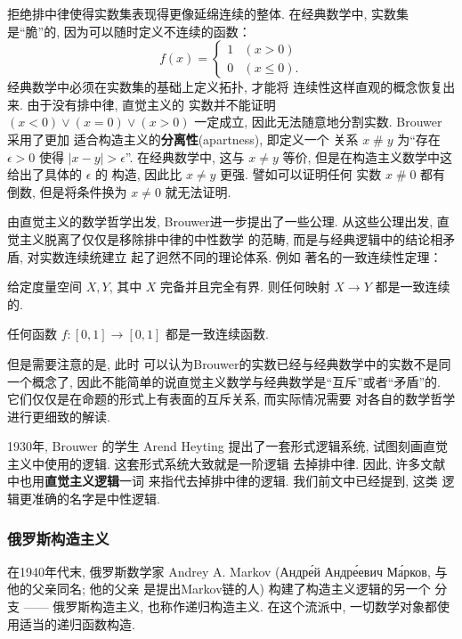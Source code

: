 拒绝排中律使得实数集表现得更像延绵连续的整体. 在经典数学中,
实数集是“脆”的, 因为可以随时定义不连续的函数：
\[f(x) = \begin{cases}
1 & (x > 0)\\
0 & (x \le 0).
\end{cases}\]
经典数学中必须在实数集的基础上定义拓扑, 才能将
连续性这样直观的概念恢复出来. 由于没有排中律, 直觉主义的
实数并不能证明 \((x < 0) \vee (x = 0) \vee (x > 0)\)
一定成立, 因此无法随意地分割实数. Brouwer 采用了更加
适合构造主义的\textbf{分离性}(apartness), 即定义一个
关系 \(x \mathop{\#} y\) 为“存在 \(\epsilon > 0\)
使得 \(|x - y| > \epsilon\)”. 在经典数学中, 这与
\(x \ne y\) 等价, 但是在构造主义数学中这给出了具体的 \(\epsilon\) 的
构造, 因此比 \(x \ne y\) 更强. 譬如可以证明任何
实数 \(x \mathop{\#} 0\) 都有倒数, 但是将条件换为
\(x \ne 0\) 就无法证明.

由直觉主义的数学哲学出发, Brouwer进一步提出了一些公理.
从这些公理出发, 直觉主义脱离了仅仅是移除排中律的中性数学
的范畴, 而是与经典逻辑中的结论相矛盾, 对实数连续统建立
起了迥然不同的理论体系. 例如
著名的一致连续性定理：
\begin{theorem}[Brouwer]
给定度量空间 \(X,Y\), 其中 \(X\) 完备并且完全有界.
则任何映射 \(X\to Y\) 都是一致连续的.
\end{theorem}
\begin{corollary}\label{ch:brouwer:funny}
任何函数 \(f : [0,1] \to [0,1]\) 都是一致连续函数.
\end{corollary}
但是需要注意的是, 此时
可以认为Brouwer的实数已经与经典数学中的实数不是同一个概念了,
因此不能简单的说直觉主义数学与经典数学是“互斥”或者“矛盾”的.
它们仅仅是在命题的形式上有表面的互斥关系, 而实际情况需要
对各自的数学哲学进行更细致的解读.

1930年, Brouwer 的学生 Arend Heyting 提出了一套形式逻辑系统,
试图刻画直觉主义中使用的逻辑. 这套形式系统大致就是一阶逻辑
去掉排中律. 因此, 许多文献中也用\textbf{直觉主义逻辑}一词
来指代去掉排中律的逻辑. 我们前文中已经提到, 这类
逻辑更准确的名字是中性逻辑.

\subsubsection{俄罗斯构造主义}

在1940年代末, 俄罗斯数学家 Andrey A. Markov
({\tempfont Андре́й Андре́евич Ма́рков}, 与他的父亲同名; 他的父亲
是提出Markov链的人) 构建了构造主义逻辑的另一个
分支 ------ 俄罗斯构造主义, 也称作递归构造主义.
在这个流派中, 一切数学对象都使用适当的递归函数构造.

